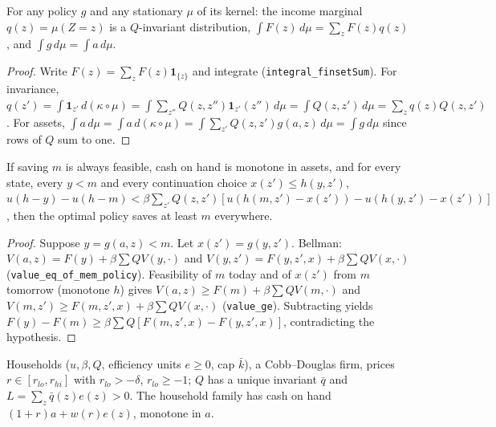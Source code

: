 \begin{lemma}
\label{lem:aiyagari_marg}
\leanok
{}
For any policy $g$ and any stationary $\mu$ of its kernel: the income marginal $q(z) = \mu(Z=z)$ is a
$Q$-invariant distribution, $\int F(z)\,d\mu = \sum_z F(z)q(z)$, and $\int g\,d\mu = \int a\,d\mu$.
\end{lemma}
\begin{proof}
\leanok
{}
Write $F(z) = \sum_z F(z)\mathbf 1_{\{z\}}$ and integrate (\texttt{integral\_finsetSum}). For invariance,
$q(z') = \int \mathbf 1_{z'}\,d(\kappa\circ\mu) = \int \sum_{z''}Q(z,z'')\mathbf 1_{z'}(z'')\,d\mu = \int Q(z,z')\,d\mu =
\sum_z q(z)Q(z,z')$. For assets, $\int a\,d\mu = \int a\,d(\kappa\circ\mu) = \int \sum_{z'}Q(z,z')g(a,z)\,d\mu =
\int g\,d\mu$ since rows of $Q$ sum to one.
\end{proof}

\begin{theorem}
\label{thm:le_policy}
\leanok
{}
If saving $m$ is always feasible, cash on hand is monotone in assets, and for every state, every $y<m$ and every
continuation choice $x(z')\le h(y,z')$,
$u(h-y) - u(h-m) < \beta\sum_{z'}Q(z,z')[u(h(m,z')-x(z')) - u(h(y,z')-x(z'))]$, then the optimal policy saves at
least $m$ everywhere.
\end{theorem}
\begin{proof}
\leanok
{}
Suppose $y = g(a,z) < m$. Let $x(z') = g(y,z')$. Bellman: $V(a,z) = F(y) + \beta\sum Q V(y,\cdot)$ and
$V(y,z') = F(y,z',x) + \beta\sum QV(x,\cdot)$ (\texttt{value\_eq\_of\_mem\_policy}). Feasibility of $m$ today and of $x(z')$
from $m$ tomorrow (monotone $h$) gives $V(a,z) \ge F(m) + \beta\sum QV(m,\cdot)$ and
$V(m,z') \ge F(m,z',x) + \beta\sum QV(x,\cdot)$ (\texttt{value\_ge}). Subtracting yields
$F(y) - F(m) \ge \beta\sum Q[F(m,z',x) - F(y,z',x)]$, contradicting the hypothesis.
\end{proof}

\begin{definition}
\label{def:aiyagari_economy}
\leanok
{}
Households ($u,\beta,Q$, efficiency units $e\ge0$, cap $\bar k$), a Cobb--Douglas firm, prices
$r\in[r_{lo},r_{hi}]$ with $r_{lo} > -\delta$, $r_{lo}\ge-1$; $Q$ has a unique invariant $\bar q$ and
$L = \sum_z\bar q(z)e(z) > 0$. The household family has cash on hand $(1+r)a + w(r)e(z)$, monotone in $a$.
\end{definition}

